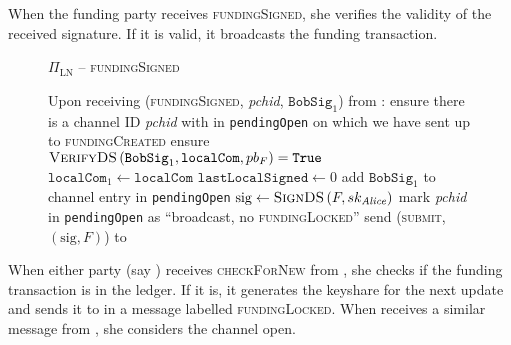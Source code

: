   When the funding party receives \textsc{fundingSigned}, she verifies the
  validity of the received signature. If it is valid, it broadcasts the funding
  transaction.

  \begin{figure}[H]
    \begin{protocolbox}{$\Pi_{\mathrm{LN}}$ -- \textsc{fundingSigned}}
      \begin{algorithmic}[1]
        \State Upon receiving (\textsc{fundingSigned}, \textit{pchid},
        $\mathtt{BobSig}_1$) from \bob:
        \Indent
          \State ensure there is a channel ID \textit{pchid} with \bob{} in
          \texttt{pendingOpen} on which we have sent up to
          \textsc{fundingCreated}
          \State ensure $\textsc{VerifyDS}\left(\mathtt{BobSig}_1,
          \mathtt{localCom}, pb_F\right) = \mathtt{True}$
          \State $\mathtt{localCom}_1 \gets \mathtt{localCom}$
          \State $\mathtt{lastLocalSigned} \gets 0$
          \State add $\mathtt{BobSig}_1$ to channel entry in
          \texttt{pendingOpen}
          \State $\mathrm{sig} \gets \textsc{SignDS}\left(F,
          sk_{\mathit{Alice}}\right)$
          \State mark \textit{pchid} in \texttt{pendingOpen} as ``broadcast, no
          \textsc{fundingLocked}''
          \label{alg:protocol:open:fundingSigned:mark}
          \State send (\textsc{submit}, $\left(\mathrm{sig}, F\right)$) to
          \ledger
        \EndIndent
      \end{algorithmic}
    \end{protocolbox}
    \caption{}
    \label{alg:protocol:open:fundingSigned}
  \end{figure}

  When either party (say \alice) receives \textsc{checkForNew} from
  \environment, she checks if the funding transaction is in the ledger. If it
  is, it generates the keyshare for the next update and sends it to \bob{} in a
  message labelled \textsc{fundingLocked}. When \alice{} receives a similar
  message from \bob, she considers the channel open.

